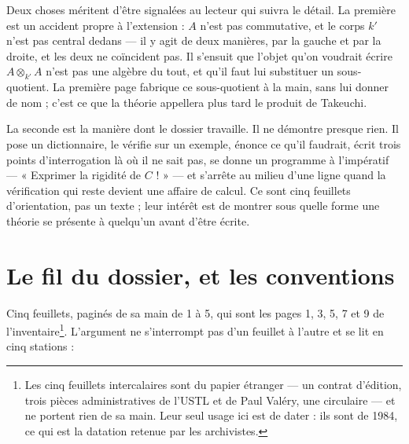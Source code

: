 \documentclass[11pt,a4paper]{article}
\begin{document}
\begin{resume}
Deux choses méritent d'être signalées au lecteur qui suivra le détail. La
première est un accident propre à l'extension : $A$ n'est pas commutative, et
le corps $k'$ n'est pas central dedans — il y agit de deux manières, par la
gauche et par la droite, et les deux ne coïncident pas. Il s'ensuit que l'objet
qu'on voudrait écrire $A \otimes_{k'} A$ n'est pas une algèbre du tout, et
qu'il faut lui substituer un sous-quotient. La première page fabrique ce
sous-quotient à la main, sans lui donner de nom ; c'est ce que la théorie
appellera plus tard le produit de Takeuchi.

La seconde est la manière dont le dossier travaille. Il ne démontre presque
rien. Il pose un dictionnaire, le vérifie sur un exemple, énonce ce qu'il
faudrait, écrit trois points d'interrogation là où il ne sait pas, se donne un
programme à l'impératif — « Exprimer la rigidité de $C$ ! » — et s'arrête au
milieu d'une ligne quand la vérification qui reste devient une affaire de
calcul. Ce sont cinq feuillets d'orientation, pas un texte ; leur intérêt est
de montrer sous quelle forme une théorie se présente à quelqu'un avant d'être
écrite.

\end{resume}

\section*{Le fil du dossier, et les conventions}

Cinq feuillets, paginés de sa main de 1 à 5, qui sont les pages 1, 3, 5, 7 et 9
de l'inventaire\footnote{Les cinq feuillets intercalaires sont du papier
étranger — un contrat d'édition, trois pièces administratives de l'USTL et de
Paul Valéry, une circulaire — et ne portent rien de sa main. Leur seul usage
ici est de dater : ils sont de 1984, ce qui est la datation retenue par les
archivistes.}. L'argument ne s'interrompt pas d'un feuillet à l'autre et se
lit en cinq stations :
\end{document}

